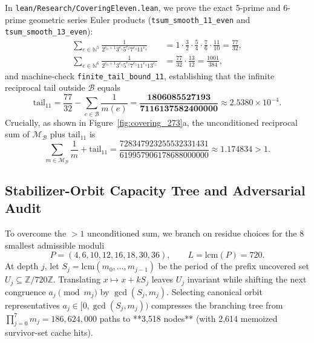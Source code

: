 \documentclass[10pt,twocolumn]{article}
\theoremstyle{definition}
\begin{document}
In \texttt{lean/Research/CoveringEleven.lean}, we prove the exact 5-prime and 6-prime geometric series Euler products (\texttt{tsum\_smooth\_11\_even} and \texttt{tsum\_smooth\_13\_even}):
\begin{align}
  \sum_{e \in \mathbb{N}^5} \frac{1}{2^{e_0+1} 3^{e_1} 5^{e_2} 7^{e_3} 11^{e_4}}
  &= 1 \cdot \frac{3}{2}\cdot\frac{5}{4}\cdot\frac{7}{6}\cdot\frac{11}{10} = \frac{77}{32}, \\
  \sum_{e \in \mathbb{N}^6} \frac{1}{2^{e_0+1} 3^{e_1} 5^{e_2} 7^{e_3} 11^{e_4} 13^{e_5}}
  &= \frac{77}{32}\cdot\frac{13}{12} = \frac{1001}{384},
\end{align}
and machine-check \texttt{finite\_tail\_bound\_11}, establishing that the infinite reciprocal tail outside $\mathcal{B}$ equals
\begin{equation}
  \mathrm{tail}_{11} = \frac{77}{32} - \sum_{e \in \mathcal{B}} \frac{1}{m(e)}
  = \frac{\mathbf{1806085527193}}{\mathbf{7116137582400000}} \approx 2.5380 \times 10^{-4}.
\end{equation}
Crucially, as shown in Figure~\ref{fig:covering_273}a, the unconditioned reciprocal sum of $\mathcal{M}_{\mathcal{B}}$ plus $\mathrm{tail}_{11}$ is
\begin{equation}
  \sum_{m \in \mathcal{M}_{\mathcal{B}}} \frac{1}{m} + \mathrm{tail}_{11}
  = \frac{728347923255532331431}{619957906178688000000} \approx \mathbf{1.174834} > 1.
\end{equation}

\subsection{Stabilizer-Orbit Capacity Tree and Adversarial Audit}
To overcome the $>1$ unconditioned sum, we branch on residue choices for the 8 smallest admissible moduli
\begin{equation}
  P = (4, 6, 10, 12, 16, 18, 30, 36), \qquad L = \mathrm{lcm}(P) = 720.
\end{equation}
At depth $j$, let $S_j = \mathrm{lcm}(m_0, \dots, m_{j-1})$ be the period of the prefix uncovered set $U_j \subseteq \mathbb{Z}/720\mathbb{Z}$. Translating $x \mapsto x + k S_j$ leaves $U_j$ invariant while shifting the next congruence $a_j \pmod{m_j}$ by $\gcd(S_j, m_j)$. Selecting canonical orbit representatives $a_j \in [0, \gcd(S_j, m_j))$ compresses the branching tree from $\prod_{j=0}^7 m_j = 186,624,000$ paths to **3,518 nodes** (with 2,614 memoized survivor-set cache hits).
\end{document}
